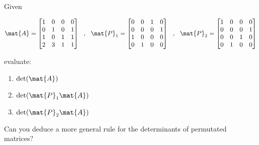 \bexo
Given

\begin{equation}
	\mat{A} = \begin{bmatrix}
		1& 0& 0& 0\\
		0& 1& 0& 1\\
		1& 0& 1& 1\\
		2& 3& 1& 1
	\end{bmatrix}
	~~,~~
	\mat{P}_1 = \begin{bmatrix}
		0& 0& 1& 0\\
		0& 0& 0& 1\\
		1& 0& 0& 0\\
		0& 1& 0& 0
	\end{bmatrix}
	~~,~~
	\mat{P}_2 = \begin{bmatrix}
		1& 0& 0& 0\\
		0& 0& 0& 1\\
		0& 0& 1& 0\\
		0& 1& 0& 0
	\end{bmatrix}
\end{equation}

evaluate:

\begin{enumerate}
	\item $\mathrm{det}(\mat{A})$
	\item $\mathrm{det}(\mat{P}_1\mat{A})$
	\item $\mathrm{det}(\mat{P}_2\mat{A})$
\end{enumerate}

Can you deduce a more general rule for the determinants of permutated matrices?
\eexo


